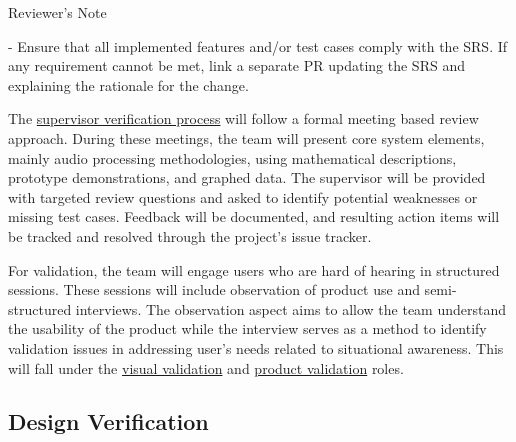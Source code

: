 \documentclass[12pt, titlepage]{article}
\newenvironment{shadedquotation}
    {\begin{shaded*}
     \quoting[leftmargin=0pt, vskip=0pt]}
    {\endquoting
     \end{shaded*}}
\begin{document}
\begin{shadedquotation}
Reviewer's Note

- Ensure that all implemented features and/or test cases comply with the SRS.
If any requirement cannot be met, link a separate PR updating the SRS and
explaining the rationale for the change.
\end{shadedquotation}

The 
\hyperref[role:audio_processing_verification]{supervisor verification process}
will follow a formal meeting based review approach. During these meetings,
the team will present core system elements, mainly audio processing
methodologies, using mathematical descriptions, prototype demonstrations,
and graphed data. The supervisor will be provided with targeted review
questions and asked to identify potential weaknesses or missing test cases.
Feedback will be documented, and resulting action items will be tracked
and resolved through the project's issue tracker. \newline


For validation, the team will engage users who are hard of hearing in structured
sessions. These sessions will include observation of product use and
semi-structured interviews. The observation aspect aims to allow the team
understand the usability of the product while the interview serves as a method 
to identify validation issues in addressing user's needs related to situational
awareness. This will fall under the 
\hyperref[role:visual_vnv]{visual validation} and
\hyperref[role:product_validation]{product validation} roles.

\subsection{Design Verification}\label{sec:design_verification}
\end{document}
